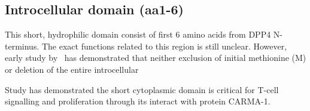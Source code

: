 \subsection{Introcellular domain (aa1-6)}

This short, hydrophilic domain consist of first 6 amino acids from DPP4 N-terminus. The exact functions related to this region is still unclear. However, early study by~\citet{Hong1990} has demonstrated that neither exclusion of initial methionine (M) or deletion of the entire introcellular 

Study has demonstrated the short cytoplasmic domain is critical for T-cell signalling and proliferation through its interact with protein CARMA-1. \cite{Ohnuma_2007}